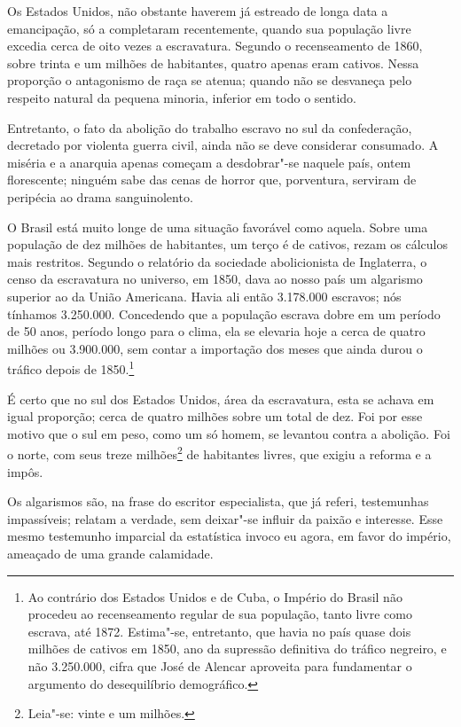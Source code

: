Os Estados Unidos, não obstante haverem já estreado de longa data a
emancipação, só a completaram recentemente, quando sua população livre
excedia cerca de oito vezes a escravatura. Segundo o recenseamento de
1860, sobre trinta e um milhões de habitantes, quatro apenas eram
cativos. Nessa proporção o antagonismo de raça se atenua; quando não se
desvaneça pelo respeito natural da pequena minoria, inferior em todo o sentido.

Entretanto, o fato da abolição do trabalho escravo no sul da
confederação, decretado por violenta guerra civil, ainda não se deve
considerar consumado. A miséria e a anarquia apenas começam a
desdobrar"-se naquele país, ontem florescente; ninguém  sabe das cenas
de horror que, porventura, serviram de peripécia ao drama sanguinolento. 

O Brasil está muito longe de uma situação favorável como aquela. Sobre
uma população de dez milhões de habitantes, um terço é de cativos,
rezam os cálculos mais restritos. Segundo o relatório da sociedade
abolicionista de Inglaterra, o censo da escravatura no universo, em
1850, dava ao nosso país um algarismo superior ao da União Americana.
Havia ali então 3.178.000 escravos; nós tínhamos 3.250.000. Concedendo
que a população escrava dobre em um período de 50 anos, período longo
para o clima, ela se elevaria hoje a cerca de quatro milhões ou
3.900.000, sem contar a importação dos meses que ainda durou o tráfico
depois de 1850.\footnote{ Ao contrário dos Estados Unidos e de Cuba, o Império do Brasil não
procedeu ao recenseamento regular de sua população, tanto livre como
escrava, até 1872. Estima"-se, entretanto, que havia no país quase
dois milhões de cativos em 1850, ano da supressão definitiva do tráfico
negreiro, e não 3.250.000, cifra que José de Alencar aproveita para
fundamentar o argumento do desequilíbrio demográfico.}
 

É certo que no sul dos Estados Unidos, área da escravatura, esta se
achava em igual proporção; cerca de quatro milhões sobre um total de
dez. Foi por esse motivo que o sul em peso, como um só homem, se
levantou contra a abolição. Foi o norte, com seus treze milhões\footnote{Leia"-se: vinte e um milhões.}  de
habitantes livres, que exigiu a reforma e a impôs.

Os algarismos são, na frase do escritor especialista, que já referi,
testemunhas impassíveis; relatam a verdade, sem deixar"-se influir da
paixão e interesse. Esse mesmo testemunho imparcial da estatística
invoco eu agora, em favor do império, ameaçado de uma grande calamidade.

